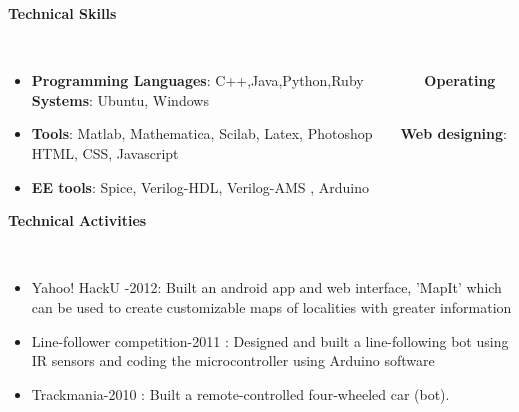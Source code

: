 \documentclass[a4paper,11pt]{article}
\newcommand{\lsep}{-0.5cm}
\newcommand{\resheading}[1]{{\small \colorbox{mygrey}{\begin{minipage}{0.975\textwidth}{\textbf{#1 \vphantom{p\^{E}}}}\end{minipage}}}}
\begin{document}
\resheading{\textbf{\large Technical Skills}}\\[\lsep]
\begin{itemize}
   \item \textbf{Programming Languages}: C++,Java,Python,Ruby \  \ \ \ \ \ \ \  \textbf{Operating Systems}: Ubuntu, Windows\\[-0.6cm]
  \item \textbf{Tools}: Matlab, Mathematica, Scilab, Latex, Photoshop\ \ \ \  \textbf{Web designing}: HTML, CSS, Javascript\\[-0.6cm]
  \item \textbf{EE tools}: Spice, Verilog-HDL, Verilog-AMS , Arduino
\end{itemize}

\resheading{\textbf{\large Technical Activities}}\\[\lsep]
\begin{itemize}
 \begin{comment}
 \item Trackmania-2010
 	\begin{itemize}
 		\item Built a remote-controlled four-wheeled car (bot). 
 		\item Designed the circuit and soldered it. 
 	\end{itemize}
 \item Participated in Line-follower competition-2011.
 	\begin{itemize}
 		\item Designed and built a line-following bot.
 		\item Used IR sensors and Coded the microcontroller using Arduino software.
	\end{itemize}
 \end{comment}
 \item Yahoo! HackU -2012: Built an android app and web interface, 'MapIt' which can be used to create customizable maps of localities with greater information\\[-0.7cm]
 \item Line-follower competition-2011 : Designed and built a line-following bot using IR sensors and coding the microcontroller using Arduino software\\[-0.7cm]
\item Trackmania-2010 : Built a remote-controlled four-wheeled car (bot).
\end{itemize}
\end{document}
